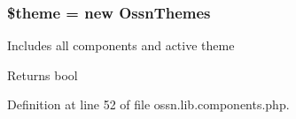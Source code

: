 \subsubsection[{\texorpdfstring{\$theme}{$theme}}]{\setlength{\rightskip}{0pt plus 5cm}\$theme = new {\bf Ossn\+Themes}}\hypertarget{ossn_8lib_8components_8php_a1ae541f7fe1c5e21cb4535f88ec9e9dc}{}\label{ossn_8lib_8components_8php_a1ae541f7fe1c5e21cb4535f88ec9e9dc}
Includes all components and active theme

\begin{DoxyReturn}{Returns}
bool 
\end{DoxyReturn}


Definition at line 52 of file ossn.\+lib.\+components.\+php.

